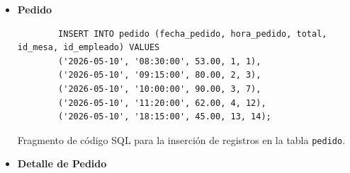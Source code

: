 \begin{itemize}
    \newpage
    \item \textbf{Pedido}
    \begin{listing}[H]
        \centering
        \begin{verbatim}
        INSERT INTO pedido (fecha_pedido, hora_pedido, total, id_mesa, id_empleado) VALUES
        ('2026-05-10', '08:30:00', 53.00, 1, 1),
        ('2026-05-10', '09:15:00', 80.00, 2, 3),
        ('2026-05-10', '10:00:00', 90.00, 3, 7),
        ('2026-05-10', '11:20:00', 62.00, 4, 12),
        ('2026-05-10', '18:15:00', 45.00, 13, 14);
        \end{verbatim}
        \caption{Fragmento de código SQL para la inserción de registros en la tabla \texttt{pedido}.}
        \label{lst:insert_pedido}
    \end{listing}
    \item \textbf{Detalle de Pedido}

\end{itemize}
